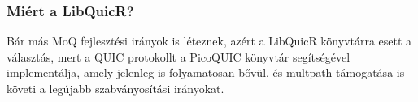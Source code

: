 \documentclass[a4paper,oneside]{article}
\begin{document}
\subsubsection{Miért a LibQuicR?}

Bár más MoQ fejlesztési irányok is léteznek, azért a LibQuicR könyvtárra esett a
választás, mert a QUIC protokollt a PicoQUIC könyvtár segítségével implementálja, amely
jelenleg is folyamatosan bővül, és multpath támogatása is követi a legújabb szabványosítási irányokat.

% 
% 
% 
% 
\end{document}
